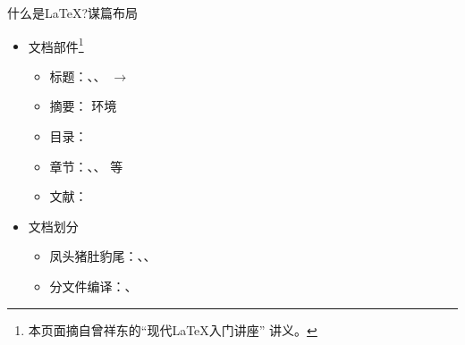 \documentclass[fontset = none, xcolor=svgnames, t, aspectratio=169]{ctexbeamer}
\begin{document}
\begin{frame}[fragile]{什么是\LaTeX?}{谋篇布局}
  \stretchon
  \begin{itemize}
  \item 文档部件\footnote[frame,1]{本页面摘自曾祥东的\enquote{现代\LaTeX 入门讲座}
      讲义。}
    \begin{itemize}
    \item 标题：\texinline{\title}、\texinline{\author}、\texinline{\date} $\to$ \texinline{\maketitle}
    \item 摘要： 环境
    \item 目录：\texinline{\tableofcontents}
    \item 章节：\texinline{\chapter}、\texinline{\section}、\texinline{\subsection} 等
    \item 文献：\texinline{}
    \end{itemize}
  \item 文档划分
    \begin{itemize}
    \item 凤头猪肚豹尾：\texinline{\frontmatter}、\texinline{\mainmatter}、\texinline{\backmatter}
    \item 分文件编译：\texinline{}、\texinline{}
    \end{itemize}
  \end{itemize}
  \stretchoff
\end{frame}
\end{document}
